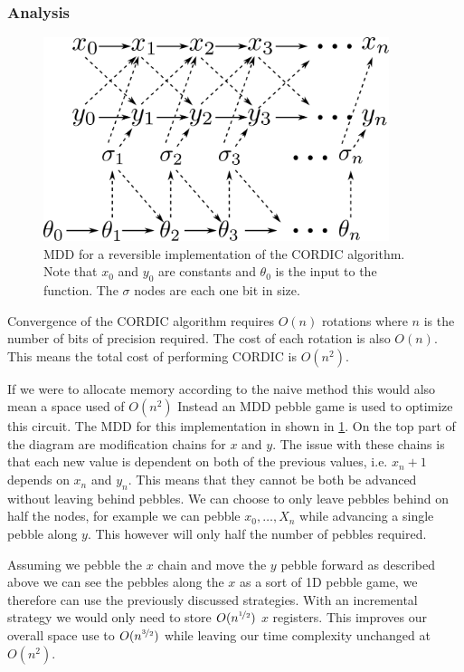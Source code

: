         \subsubsection{Analysis}
	\begin{figure}
                \capstart
                \centering
                \includegraphics[width=0.9\textwidth]{images/CordicMDD}

                \caption{MDD for a reversible implementation of the CORDIC
                algorithm. Note that $x_0$ and $y_0$ are constants and
                $\theta_0$ is the input to the function.
                The $\sigma$ nodes are each one bit in size.}

                \label{fig:CordicMDD}
        \end{figure}

	Convergence of the CORDIC algorithm requires $O(n)$ rotations where $n$
	is the number of bits of precision required.  The cost of each rotation
	is also $O(n)$. This means the total cost of performing CORDIC is
	$O(n^2)$.

	If we were to allocate memory according to the naive method this would
	also mean a space used of $O(n^2)$ Instead an MDD pebble game is used
	to optimize this circuit.  The MDD for this implementation in shown in
	\cref{fig:CordicMDD}. On the top part of the diagram are modification
	chains for $x$ and $y$. The issue with these chains is that each new
	value is dependent on both of the previous values, i.e. $x_n+1$ depends
	on $x_n$ and $y_n$. This means that they cannot be both be advanced
	without leaving behind pebbles. We can choose to only leave pebbles
	behind on half the nodes, for example we can pebble $x_0,\dotsc,X_n$
	while advancing a single pebble along $y$. This however will only half
	the number of pebbles required.

	Assuming we pebble the $x$ chain and move the $y$ pebble forward as
	described above we can see the pebbles along the $x$ as a sort of 1D
	pebble game, we therefore can use the previously discussed strategies.
	With an incremental strategy we would only need to store
	$O(n^{\nicefrac{1}{2}})$ $x$ registers. This improves our overall space
	use to $O(n^{\nicefrac{3}{2}})$ while leaving our time complexity
	unchanged at $O(n^2)$.

